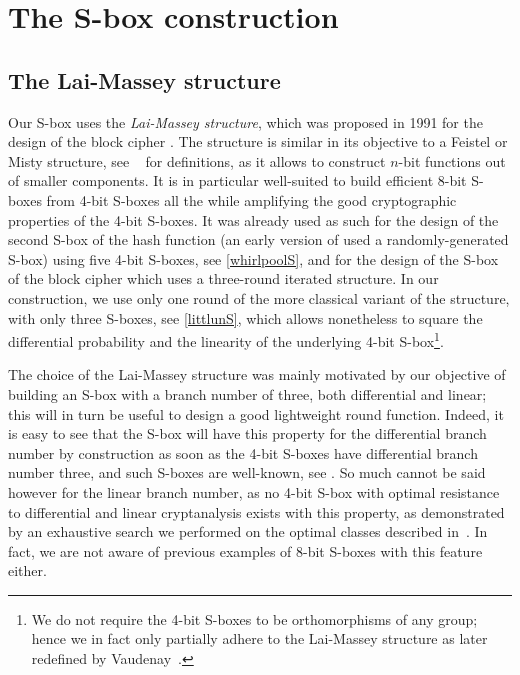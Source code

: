 \section{The \littlun S-box construction}
\label{sec:litt}


\subsection{The Lai-Massey structure}
Our S-box uses the \emph{Lai-Massey structure}, which was proposed in 1991 for the design
of the block cipher \idea \cite{idea}. The structure is similar in its objective to a Feistel or Misty structure,
see \eg{}~\cite{sac15} for definitions,
as it allows to construct $n$-bit functions out of smaller components. It is in particular well-suited
to build efficient 8-bit S-boxes from 4-bit S-boxes all the while amplifying the good cryptographic
properties of the 4-bit S-boxes.
It was already used as such for the design of the second S-box of the \whirlpool hash function
\cite{whirlpool} (an early version of \whirlpool used a randomly-generated S-box) using five
4-bit S-boxes, see \autoref{whirlpoolS},
and for the design of the S-box of the \fox block cipher \cite{fox} which uses a three-round iterated structure.
In our construction, we use only one round of the more classical variant of the structure, with only three S-boxes,
see \autoref{littlunS}, which allows nonetheless to square the differential probability
and the linearity of the underlying 4-bit S-box\footnote{We do not require the 4-bit S-boxes to
be orthomorphisms of any group; hence we in fact only partially adhere to the Lai-Massey structure as later redefined
by Vaudenay~\cite{vaudmassey}.}.

The choice of the Lai-Massey structure was mainly motivated by our objective of building
an S-box with a branch number of three, both differential and linear; this will in turn be useful to design a good lightweight round function.
Indeed, it is easy to see that the S-box will
have this property for the differential branch number by construction as soon as the 4-bit S-boxes have differential branch number three,
and such S-boxes are well-known, see \eg \serpent \cite{serpent}. So much cannot be said however for
the linear branch number, as no 4-bit S-box with optimal resistance to differential and linear cryptanalysis exists with this property, as
demonstrated by an exhaustive search we performed on the optimal classes described \eg{} in~\cite{class4bit}. In fact, we are not aware
of previous examples of 8-bit S-boxes with this feature either.

